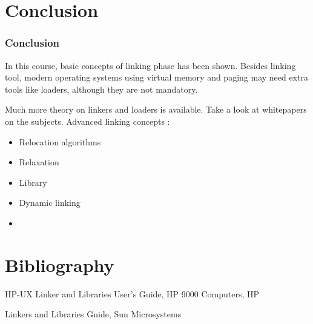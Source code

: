 %
%

\section{Conclusion}


\begin{frame}
  \frametitle{Conclusion}

  In this course, basic concepts of linking phase has been shown. Besides
  linking tool, modern operating systems using virtual memory and paging
  may need extra tools like loaders, although they are not mandatory.

  \-

  Much more theory on linkers and loaders is available. Take a look
  at whitepapers on the subjects. Advanced linking concepts :

  \begin{itemize}
    \item
        Relocation algorithms
    \item
        Relaxation
    \item
        Library
    \item
        Dynamic linking
    \item
      \etc{}
  \end{itemize}

\end{frame}



%
%

\section{Bibliography}

\begin{thebibliography}{3}
HP-UX Linker and Libraries User's Guide, HP 9000 Computers, HP

Linkers and Libraries Guide, Sun Microsystems

\end{thebibliography}



